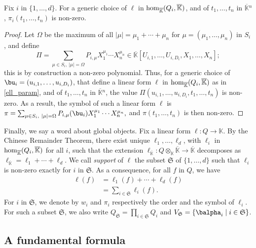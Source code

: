 \documentclass[12pt]{article}
\def\K{\mathbb{K}}
\def\K {\ensuremath{\mathbb{K}}}
\def\Kbar {{\ensuremath{\overline{\mathbb{K}}}}}
\begin{document}
\begin{lemma}\label{lemma:symbol0}
  Fix $i$ in $\{1,\dots,d\}$. For a generic choice of $\ell$ in
  ${\rm hom}_\Kbar(Q_i,\Kbar)$, and of $t_1,\dots,t_n$ in $\Kbar{}^n$,
  $\pi_i(t_1,\dots,t_n)$ is non-zero.
\end{lemma}
\begin{proof}
  Let $\Omega$ be the maximum of all $|\mu|=\mu_1+\cdots+\mu_n$ for
  $\mu=(\mu_1,\dots,\mu_n)$ in $S_i$, and define 
	$$\Pi =\sum_{\mu \in S_i,\ |\mu|=\Omega}P_{i,\mu} X_1^{\mu_1}
  \cdots X_n^{\mu_n} \in
  \Kbar[U_{i,1},\dots,U_{i,D_i},X_1,\dots,X_n];$$ this is by
  construction a non-zero polynomial.  Thus, for a generic choice of
  $\bu_i=(u_{i,1},\dots,u_{i,D_i})$, that define a linear form
  $\ell$ in ${\rm hom}_\Kbar(Q_i,\Kbar)$ as in \cref{ell_param},
  and of $t_1,\dots,t_n$ in $\Kbar{}^n$, the value
  $\Pi(u_{i,1},\dots,u_{i,D_i},t_1,\dots,t_n)$ is non-zero. As a
  result, the symbol of such a linear form $\ell$ is $\pi
  =\sum_{\mu \in S_i,\ |\mu|=\Omega}P_{i,\mu}(\bu_i) X_1^{\mu_1}
  \cdots X_n^{\mu_n},$ and $\pi(t_1,\dots,t_n)$ is then non-zero.
\end{proof}

Finally, we say a word about global objects.  Fix a linear form $\ell:
Q \to \K$. By the Chinese Remainder Theorem, there exist unique
$\ell_1,\dots,\ell_d$, with $\ell_i$ in ${\rm hom}_\Kbar(Q_i,\Kbar)$
for all $i$, such that the extension $\ell_\Kbar: Q\otimes_\K \Kbar
\to \Kbar$ decomposes as $\ell_\Kbar = \ell_1 + \cdots + \ell_d$. We
call {\em support} of $\ell$ the subset $\mathfrak{S}$ of
$\{1,\dots,d\}$ such that $\ell_i$ is non-zero exactly for $i$ in
$\mathfrak{S}$.  As a consequence, for all $f$ in $Q$, we have
\begin{align}\label{eq:fui}
\ell(f) &= \ell_1(f) + \cdots + \ell_d(f)\nonumber\\
&=  \sum_{i \in \mathfrak{S}} \ell_i(f).
\end{align}
For $i$ in $\mathfrak{S}$, we denote by $w_i$ and $\pi_i$ respectively
the order and the symbol of $\ell_i$. For such a subset
$\mathfrak{S}$, we also write $Q_\mathfrak{S}=\prod_{i \in
  \mathfrak{S}} Q_i$ and $V_\mathfrak{S}=
\{\balpha_i \mid i \in \mathfrak{S}\}$.


\subsection{A fundamental formula}  
\end{document}
